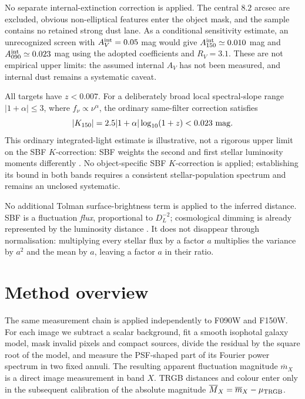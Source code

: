 \documentclass[nodoi,nocopyright]{pas}
\newcommand{\mbar}{\overline{m}}
\newcommand{\Mbar}{\overline{M}}
\begin{document}
No separate internal-extinction correction is applied. The central
$8.2$ arcsec are excluded, obvious non-elliptical features enter the object
mask, and the sample contains no retained strong dust lane. As a conditional
sensitivity estimate, an unrecognized screen with $A_V^{\rm int}=0.05$ mag
would give $A_{150}^{\rm int}\simeq0.010$ mag and
$A_{090}^{\rm int}\simeq0.023$ mag using the adopted coefficients and
$R_V=3.1$. These are not empirical upper limits: the assumed internal
$A_V$ has not been measured, and internal dust remains a systematic caveat.

All targets have $z<0.007$. For a deliberately broad local spectral-slope
range $|1+\alpha|\leq3$, where $f_\nu\propto\nu^\alpha$, the ordinary
same-filter correction satisfies
\begin{equation}
 |K_{150}|=2.5|1+\alpha|\log_{10}(1+z)<0.023~{\rm mag}.
\end{equation}
This ordinary integrated-light estimate is illustrative, not a rigorous
upper limit on the SBF $K$-correction: SBF weights the second and first
stellar luminosity moments differently \citep{Cervino2008}. No object-specific
SBF $K$-correction is applied; establishing its bound in both bands requires
a consistent stellar-population spectrum and remains an unclosed systematic.

No additional Tolman surface-brightness term is applied to the inferred
distance. SBF is a fluctuation \emph{flux}, proportional to $D_L^{-2}$;
cosmological dimming is already represented by the luminosity distance
\citep{Hogg1999}. It does not disappear through normalisation: multiplying
every stellar flux by a factor $a$ multiplies the variance by $a^2$ and the
mean by $a$, leaving a factor $a$ in their ratio.

\section{Method overview}

The same measurement chain is applied independently to F090W and F150W.
For each image we subtract a scalar background, fit a smooth isophotal galaxy
model, mask invalid pixels and compact sources, divide the residual by the
square root of the model, and measure the PSF-shaped part of its Fourier power
spectrum in two fixed annuli.  The resulting apparent fluctuation magnitude
$\mbar_X$ is a direct image measurement in band $X$.  TRGB distances and
colour enter only in the subsequent calibration of the absolute magnitude
$\Mbar_X=\mbar_X-\mu_{\rm TRGB}$.
\end{document}
